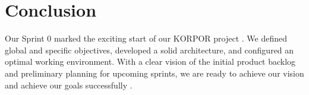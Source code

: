 \section*{Conclusion}

Our Sprint 0 marked the exciting start of our KORPOR project \cite{ScaledAgileFramework2024, SutherlandScrum2020}. We defined global and specific objectives, developed a solid architecture, and configured an optimal working environment. With a clear vision of the initial product backlog and preliminary planning for upcoming sprints, we are ready to achieve our vision and achieve our goals successfully \cite{SchwarzScrum2019, RubinEssentialScrum2012}.

